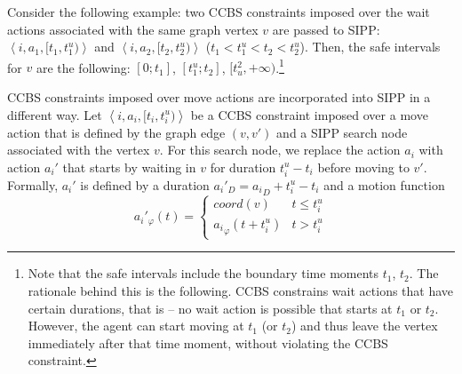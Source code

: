 \documentclass[review]{elsarticle}
\newcommand{\tuple}[1]{\ensuremath{\left \langle #1 \right \rangle }}
\newcommand\konstantin[1]{\nb{\textbf{Konstantin:}}{red}{#1}}
\newcommand\roni[1]{\nb{\textbf{Roni:}}{green}{#1}}
\newcommand{\ccbs}{\ac{CCBS}\xspace}
\newcommand{\sipp}{\ac{SIPP}\xspace}
\newcommand{\coord}{\textit{coord}\xspace}
\begin{document}
Consider the following example: two \ccbs constraints imposed over the wait actions associated with the same graph vertex $v$ are passed to \sipp: $\tuple{i, a_1, [t_1, t^u_1)}$ and $\tuple{i, a_2, [t_2, t^u_2)}$ ($t_1 < t^u_1 < t_2 < t^u_2$). Then, the safe intervals for $v$ are the following: $[0; t_1]$, $[t^u_1; t_2]$, $[t_u^2, +\infty)$.\footnote{Note that the safe intervals include the boundary time moments $t_1$, $t_2$. The rationale behind this is the following. \ccbs constrains wait actions that have certain durations, that is -- no wait action is possible that starts at $t_1$ or $t_2$. However, the agent can start moving at $t_1$ (or $t_2$) and thus leave the vertex immediately after that time moment, without violating the \ccbs constraint.}

\ccbs constraints imposed over move actions are incorporated into \sipp in a different way. Let $\tuple{i, a_i, [t_i, t^u_i)}$ be a \ccbs constraint imposed over a move action that is defined by the graph edge $(v, v')$ and a \sipp search node associated with the vertex $v$. 
For this search node, we replace the action $a_i$ 
with action $a_i'$ that starts by waiting in $v$ for duration $t^u_i-t_i$ before moving to $v'$.
Formally, $a_i'$ is defined by a duration ${a_i}'_D={a_i}_D+t^u_i-t_i$ and a motion function
\begin{equation}
{a_i}'_\varphi(t)=
\begin{cases}
    \coord(v) & t\leq t^u_i\\
    {a_i}_\varphi(t+t^u_i) & t>t^u_i
\end{cases}
\end{equation}
\end{document}
